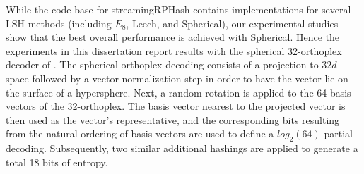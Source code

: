 
While the code base for \textsf{streamingRPHash} contains implementations for several LSH methods (including $E_8$,
Leech, and Spherical), our experimental studies show that the best overall performance is achieved with Spherical.
Hence the experiments in this dissertation report results with the spherical 32-orthoplex decoder of \cite{SLSH}.  The
spherical orthoplex decoding consists of a projection to 32$d$ space followed by a vector normalization step in order to
have the vector lie on the surface of a hypersphere.  Next, a random rotation is applied to the 64 basis vectors of the
32-orthoplex.  The basis vector nearest to the projected vector is then used as the vector's representative, and the
corresponding bits resulting from the natural ordering of basis vectors are used to define a $log_2(64)$ partial
decoding.  Subsequently, two similar additional hashings are applied to generate a total 18 bits of entropy.


